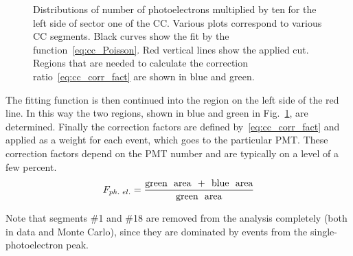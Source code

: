 \begin{figure}[htp]
\begin{center}
\caption{\small Distributions of number of photoelectrons multiplied by ten for the left side of sector one of the CC. Various plots correspond to various CC segments. Black curves show the fit by the function~\eqref{eq:cc_Poisson}. Red vertical lines show the applied cut. Regions that are needed to calculate the correction ratio~\eqref{eq:cc_corr_fact} are shown in blue and green. } \label{fig:nphe_cut}
\end{center}
\end{figure}


The fitting function is then continued into the region on the left side of the red line. In this way the two regions, shown in blue and green in Fig.~\ref{fig:nphe_cut}, are determined. Finally the correction factors are defined by~\eqref{eq:cc_corr_fact} and applied as a weight for each event, which goes to the particular PMT. These correction factors depend on the PMT number and are typically on a level of a few percent.
\begin{equation}
F_{ph.\,\, el.} = \frac{\textrm{green\,\,  area \,\,+\,\, blue\,\,  area}}{\textrm{green\,\,  area}}
\label{eq:cc_corr_fact}
\end{equation}

Note that segments \#1 and \#18 are removed from the analysis completely (both in data and Monte Carlo), since they are dominated by events from the single-photoelectron peak. 




